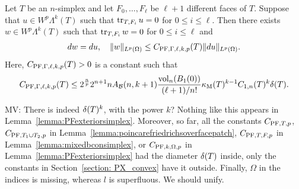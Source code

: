 \documentclass[10pt,a4paper]{article}
\newcommand{\mwl}[1]{{\color{red}#1}}
\begin{document}
\begin{lemma}\label{lemma:mixedbconsimplex:exteriorderivative}
    Let $T$ be an $n$-simplex 
    and let $F_{0},\dots,F_{\ell}$ be $\ell+1$ different faces of $T$. 
    Suppose that $u \in W^{p}\Lambda^{k}(T)$ such that 
    $\operatorname{tr}_{T,F_i} u = 0$ for $0 \leq i \leq \ell$.
    Then there exists $w \in W^{p}\Lambda^{k}(T)$ such that 
    $\operatorname{tr}_{T,F_i} w = 0$ for $0 \leq i \leq \ell$
    and  
    \begin{align*}
        d w = d u,
        \quad 
        \| w \|_{L^{p}(\Omega)} 
        \leq 
        C_{{\rm PF},\Gamma,\ell,k,p}(T)
        \| d u \|_{L^{p}(\Omega)}
        .
    \end{align*}
    Here, $C_{{\rm PF},\Gamma,\ell,k,p}(T) > 0$ is a constant such that 
    \begin{align*}
        C_{{\rm PF},\Gamma,\ell,k,p}(T)
        \leq 
        2^{\frac n p}
        2^{n+1} n A_{{\mathcal B}}(n,k+1) \frac{ \operatorname{vol}_{n}(B_1(0)) }{ (\ell+1)/n! } 
        \kappa_{\rm M}(T)^{k-1}
        C_{1,n}(T)^{k}
        {\delta}(T)
        .
    \end{align*}
\end{lemma}
\mwl{MV: There is indeed ${\delta}(T)^{k}$, with the power $k$? Nothing like this appears in Lemma~\ref{lemma:PFexteriorsimplex}. Moreover, so far, all the constants $C_{{{\rm PF}},T,p}$, $C_{{{\rm PF}},T_1 \cup T_2,p}$ in Lemma~\ref{lemma:poincarefriedrichsoverfacepatch}, $C_{{\rm PF},T,F,p}$ in Lemma~\ref{lemma:mixedbconsimplex}, or $C_{{{\rm PF}},k,\Omega,p}$ in Lemma~\ref{lemma:PFexteriorsimplex} had the diameter ${\delta}(T)$ inside, only the constants in Section~\ref{section: PX_convex} have it outside. Finally, $\Omega$ in the indices is missing, whereas $l$ is superfluous. We should unify.}
\end{document}
